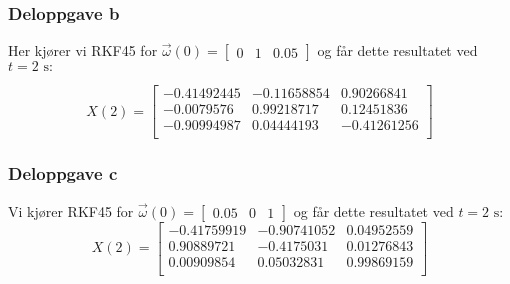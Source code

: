 \subsubsection{Deloppgave b}
Her kjører vi RKF45 for $\vec{\omega}(0) = \begin{bmatrix}0 & 1 & 0.05 \end{bmatrix}$ og får dette resultatet ved $t=2\text{ s}:$

\begin{equation}
    X(2) = \begin{bmatrix}
    -0.41492445 & -0.11658854 & 0.90266841 \\
    -0.0079576 & 0.99218717 & 0.12451836 \\
    -0.90994987 & 0.04444193 & -0.41261256 \\
    \end{bmatrix}
\end{equation}
\subsubsection{Deloppgave c}
Vi kjører RKF45 for $\vec{\omega}(0)=\begin{bmatrix}0.05&0&1\end{bmatrix}$ og får dette resultatet ved $t=2\text{ s}:$
\begin{equation}
X(2)=
\begin{bmatrix}
-0.41759919 & -0.90741052 & 0.04952559\\
0.90889721 & -0.4175031 & 0.01276843\\
0.00909854 & 0.05032831 & 0.99869159\\
\end{bmatrix}
\end{equation}